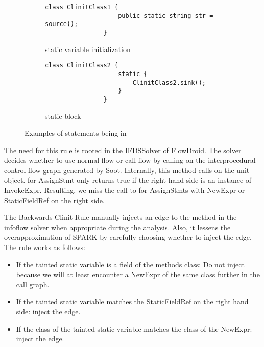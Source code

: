 \documentclass[../draft.tex]{subfiles}
\begin{document}
    \begin{figure}[ht]
        \centering
        \begin{subfigure}[b]{0.45\textwidth}
            \centering
            \begin{lstlisting}[gobble=16]
                class ClinitClass1 {
                    public static string str = source();
                }
            \end{lstlisting}
            \caption{static variable initialization}
            \label{lst:clinit_examples_a}
        \end{subfigure}
        \hfill
        \begin{subfigure}[b]{0.45\textwidth}
            \centering
            \begin{lstlisting}[gobble=16]
                class ClinitClass2 {
                    static {
                        ClinitClass2.sink();
                    }
                }
            \end{lstlisting}
            \caption{static block}
            \label{lst:clinit_examples_b}
        \end{subfigure}
        \caption{Examples of statements being in }
        \label{lst:clinit_examples}
    \end{figure}


    The need for this rule is rooted in the IFDSSolver of FlowDroid. The solver decides whether to use normal flow or call flow by calling  on the interprocedural control-flow graph generated by Soot. Internally, this method calls  on the unit object.  for AssignStmt only returns true if the right hand side is an instance of InvokeExpr. Resulting, we miss the call to  for AssignStmts with NewExpr or StaticFieldRef on the right side.

    The Backwards Clinit Rule manually injects an edge to the  method in the infoflow solver when appropriate during the analysis. Also, it lessens the overapproximation of SPARK by carefully choosing whether to inject the edge. The rule works as follows:
    \begin{itemize}
        \item If the tainted static variable is a field of the methods class: Do not inject because we will at least encounter a NewExpr of the same class further in the call graph.
        \item If the tainted static variable matches the StaticFieldRef on the right hand side: inject the edge.
        \item If the class of the tainted static variable matches the class of the NewExpr: inject the edge.
    \end{itemize}
\end{document}
